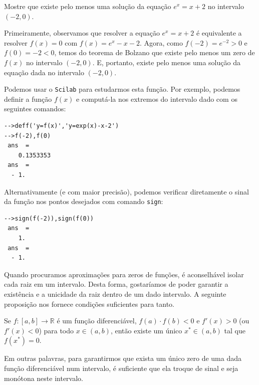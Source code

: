 \begin{ex}\label{ex:teorema_de_Bolzano}
Mostre que existe pelo menos uma solução da equação $e^x=x+2$ no intervalo $(-2,0)$.
\begin{sol}
Primeiramente, observamos que resolver a equação $e^x = x+2$ é equivalente a resolver $f(x) = 0$ com $f(x)=e^x-x-2$. Agora, como $f(-2)=e^{-2}>0$ e $f(0)=-2<0$, temos do teorema de Bolzano que existe pelo menos um zero de $f(x)$ no intervalo $(-2, 0)$. E, portanto, existe pelo menos uma solução da equação dada no intervalo $(-2, 0)$.

\ifisscilab
Podemos usar o \verb+Scilab+ para estudarmos esta função. Por exemplo, podemos definir a função $f(x)$ e computá-la nos extremos do intervalo dado com os seguintes comandos:
\begin{verbatim}
-->deff('y=f(x)','y=exp(x)-x-2')
-->f(-2),f(0)
 ans  =
    0.1353353  
 ans  =
  - 1.  
\end{verbatim}
Alternativamente (e com maior precisão), podemos verificar diretamente o sinal da função nos pontos desejados com comando \verb+sign+:
\begin{verbatim}
-->sign(f(-2)),sign(f(0))
 ans  =
    1.  
 ans  =
  - 1.  
\end{verbatim}
\fi
\end{sol}
\end{ex}

Quando procuramos aproximações para zeros de funções, é aconselhável isolar cada raiz em um intervalo. Desta forma, gostaríamos de poder garantir a existência e a unicidade da raiz dentro de um dado intervalo. A seguinte proposição nos fornece condições suficientes para tanto.

\begin{prop}\label{prop:existencia_e_unicidade}
Se $f:[a, b]\to\mathbb{R}$ é um função diferenciável, $f(a)\cdot f(b)<0$ e $f'(x)>0$ (ou $f'(x)<0$) para todo $x\in(a, b)$, então existe um único $x^*\in (a, b)$ tal que $f(x^*) = 0$.
\end{prop}

Em outras palavras, para garantirmos que exista um único zero de uma dada função diferenciável num intervalo, é suficiente que ela troque de sinal e seja monótona neste intervalo.

